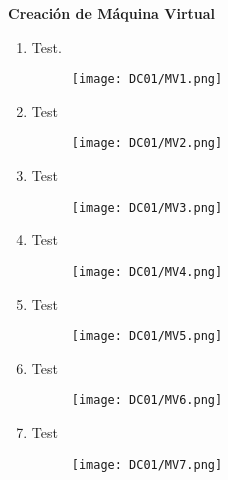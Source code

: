 \textbf{Creación de Máquina Virtual}
\begin{enumerate}
\item Test.
\begin{figure}[H] %
\begin{center}
\texttt{[image: DC01/MV1.png]}
\end{center}
\end{figure}

\item Test
\begin{figure}[H] %
\begin{center}
\texttt{[image: DC01/MV2.png]}
\end{center}
\end{figure}

\item Test
\begin{figure}[H] %
\begin{center}
\texttt{[image: DC01/MV3.png]}
\end{center}
\end{figure}

\item Test
\begin{figure}[H] %
\begin{center}
\texttt{[image: DC01/MV4.png]}
\end{center}
\end{figure}

\item Test
\begin{figure}[H] %
\begin{center}
\texttt{[image: DC01/MV5.png]}
\end{center}
\end{figure}

\item Test
\begin{figure}[H] %
\begin{center}
\texttt{[image: DC01/MV6.png]}
\end{center}
\end{figure}

\item Test
\begin{figure}[H] %
\begin{center}
\texttt{[image: DC01/MV7.png]}
\end{center}
\end{figure}

\end{enumerate}



